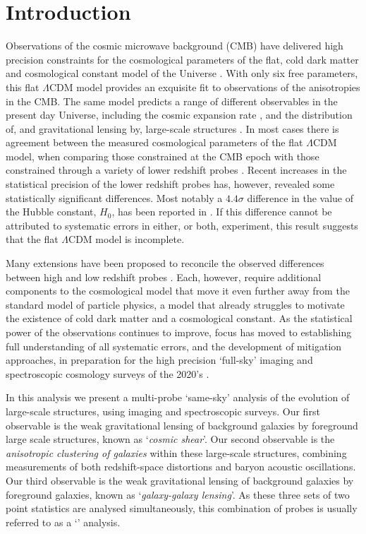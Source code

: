 \section{Introduction}
\label{sec:intro}

Observations of the cosmic microwave background (CMB) have delivered high precision
constraints for the cosmological parameters of the flat, cold dark
matter and cosmological constant model of the Universe
\citep[$\Lambda$CDM,][]{planck/etal:2018}.  With only six free
parameters, this flat $\Lambda$CDM model provides an exquisite fit to observations of
the anisotropies in the CMB.    The same model predicts a range of
different observables in the present day Universe, including the cosmic expansion rate \citep{weinberg/1972}, and the
distribution of, and gravitational lensing by, large-scale
structures \citep{peebles/1980,bartelmann/schneider:2001,eisenstein/etal:2005}.  
In most cases there
is agreement between the measured cosmological parameters of the flat $\Lambda$CDM model, when comparing those
constrained at the CMB epoch with those constrained through a variety of
lower redshift probes \citep[see the discussion in][and references
therein]{planck/etal:2018}.   Recent increases in the statistical
precision of the lower redshift probes has,
however, revealed some statistically significant differences.  Most
notably a $4.4\sigma$ difference in the value of the Hubble constant,
$H_0$, has been reported in \citet{riess/etal:2019}.  If this difference cannot be
attributed to systematic errors in either, or both, experiment, this result
suggests that the flat $\Lambda$CDM model is incomplete.

Many
extensions have been proposed to reconcile the observed differences between
high and low redshift probes \citep[see for
example][]{poulin/etal:2018,divalentino/etal:2020}.  Each, however, require
additional components
to the cosmological model that move it even further away from the
standard model of particle physics, a model that already struggles to motivate
the existence of cold dark matter and a cosmological constant.  
As the statistical power of the observations continues to improve, focus has moved to establishing
full understanding of all systematic errors, and the development of mitigation approaches, 
in preparation for the high precision `full-sky' imaging and spectroscopic
cosmology surveys of the 2020's \citep[Euclid,][]{laureijs/etal:2011,lsst/etal:2009,DESI/etal:2016}.

In this analysis we present a multi-probe `same-sky' analysis of the
evolution of large-scale structures, using imaging and spectroscopic surveys.
Our first observable is the weak gravitational lensing of background
galaxies by foreground large scale
structures, 
known as `{\it cosmic shear}'.    Our second
observable is the {\it anisotropic clustering of galaxies} within these
large-scale structures, combining measurements of both redshift-space
distortions and baryon acoustic
oscillations.   Our third observable is the weak gravitational lensing of background
galaxies by foreground galaxies, known as
`{\it galaxy-galaxy lensing}'.   As these three sets of two point
statistics are analysed simultaneously, this combination of probes
is usually referred to as a `\tttp' analysis. 

